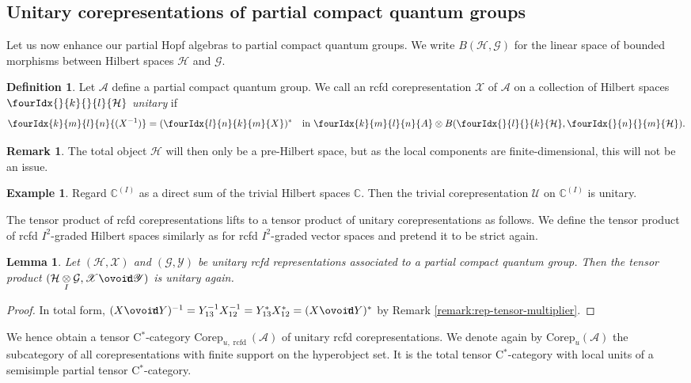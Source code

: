 \documentclass[10pt]{article}
\DeclareMathOperator{\rcf}{\mathrm{rcfd}}
\newcommand{\Corep}{\mathrm{Corep}}
\newcommand{\Circt}{{\mathop{\ooalign{$\ovoid$\cr\hidewidth\raise-.05ex\hbox{$\scriptstyle\mathsf T\mkern3.5mu$}\cr}}}} %
\newcommand{\C}{\mathbb{C}}
\newcommand{\Hsp}{\mathcal{H}}
\newcommand{\itimes}{\underset{I}{\otimes}}
\newcommand{\Gr}[5]{\fourIdx{#2}{#4}{#3}{#5}{#1}}%
\newcommand{\Gru}[3]{\Gr{#1}{}{}{#2}{#3}}
\newtheorem{Lem}[Theorem]{Lemma}
\theoremstyle{definition}
\newtheorem{Def}[Theorem]{Definition}
\newtheorem{Rem}[Theorem]{Remark}
\newtheorem{Exa}[Theorem]{Example}
\numberwithin{equation}{section}
\begin{document}
\subsection{Unitary corepresentations of partial compact quantum groups}


Let us now enhance our partial Hopf algebras to partial compact
quantum groups. We write $B(\Hsp,\mathcal{G})$ for the linear space of
bounded morphisms between Hilbert spaces $\Hsp$ and $\mathcal{G}$. 

\begin{Def} Let $\mathscr{A}$ define a partial compact quantum
  group. We call an rcfd corepresentation $\mathscr{X}$ of $\mathscr{A}$ on a collection of Hilbert spaces $\Gru{\Hsp}{k}{l}$ 
   \emph{unitary}
  if \[\Gr{(X^{-1})}{k}{l}{m}{n}=(\Gr{X}{l}{k}{n}{m})^{*}\quad
  \textrm{in }\Gr{A}{k}{l}{m}{n}\otimes
  B(\Gru{\Hsp}{l}{k},\Gru{\Hsp}{n}{m}).\]
\end{Def} 


\begin{Rem}
The total object $\Hsp$ will then only be a pre-Hilbert space, but as the local components are finite-dimensional, this will not be an issue.
\end{Rem}

\begin{Exa}\label{example:rep-trivial-unitary}
  Regard $\C^{(I)}$ as a direct sum of the trivial Hilbert spaces $\C$. Then the
  trivial corepresentation $\mathscr{U}$ on $\C^{(I)}$ is unitary.
\end{Exa}

The tensor product of rcfd corepresentations lifts to a tensor product
of unitary corepresentations as follows.  We define the tensor product
of rcfd $I^{2}$-graded Hilbert spaces similarly as for rcfd
$I^{2}$-graded vector spaces and pretend it to be strict again.
\begin{Lem}\label{lemma:rep-unitary-tensor}
  Let $(\Hsp,\mathscr{X})$ and $(\mathcal{G},\mathscr{Y})$ be unitary
  rcfd representations associated to a partial compact quantum group. Then the
  tensor product $(\Hsp \itimes \mathcal{G},\mathscr{X} \Circt
  \mathscr{Y})$ is unitary again.
\end{Lem}
\begin{proof}
In total form,  $(X\Circt Y)^{-1} = Y_{13}^{-1}X_{12}^{-1}
  =Y_{13}^{*}X_{12}^{*} = (X \Circt Y)^{*}$ by Remark \ref{remark:rep-tensor-multiplier}.
\end{proof}

We hence obtain a tensor C$^*$-category $\Corep_{u,\rcf}(\mathscr{A})$ of unitary rcfd corepresentations. We denote again by $\Corep_u(\mathscr{A})$ the subcategory of all corepresentations with finite support on the hyperobject set. It is the total tensor C$^*$-category with local units of a semisimple partial tensor C$^*$-category.
\end{document}
